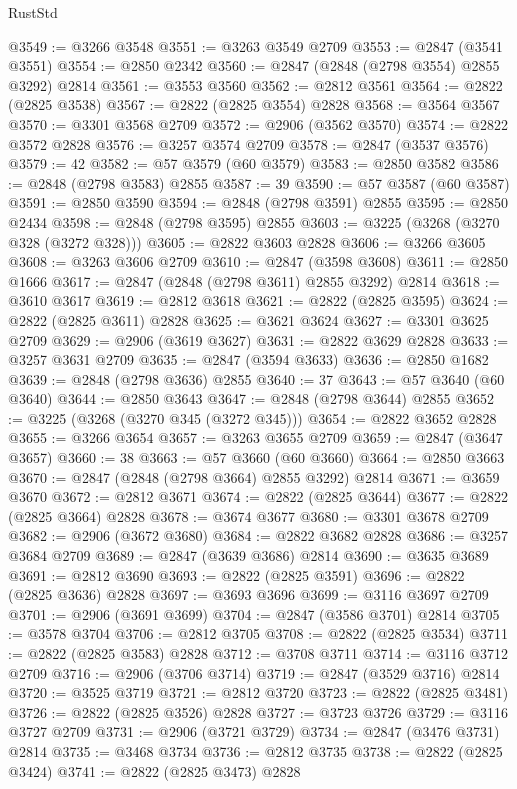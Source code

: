 \begin{lexlean}{RustStd}
\begin{coremodule}
@3549 := @3266 @3548
@3551 := @3263 @3549 @2709
@3553 := @2847 (@3541 @3551)
@3554 := @2850 @2342
@3560 := @2847 (@2848 (@2798 @3554) @2855 @3292) @2814
@3561 := @3553 @3560
@3562 := @2812 @3561
@3564 := @2822 (@2825 @3538)
@3567 := @2822 (@2825 @3554) @2828
@3568 := @3564 @3567
@3570 := @3301 @3568 @2709
@3572 := @2906 (@3562 @3570)
@3574 := @2822 @3572 @2828
@3576 := @3257 @3574 @2709
@3578 := @2847 (@3537 @3576)
@3579 := 42
@3582 := @57 @3579 (@60 @3579)
@3583 := @2850 @3582
@3586 := @2848 (@2798 @3583) @2855
@3587 := 39
@3590 := @57 @3587 (@60 @3587)
@3591 := @2850 @3590
@3594 := @2848 (@2798 @3591) @2855
@3595 := @2850 @2434
@3598 := @2848 (@2798 @3595) @2855
@3603 := @3225 (@3268 (@3270 @328 (@3272 @328)))
@3605 := @2822 @3603 @2828
@3606 := @3266 @3605
@3608 := @3263 @3606 @2709
@3610 := @2847 (@3598 @3608)
@3611 := @2850 @1666
@3617 := @2847 (@2848 (@2798 @3611) @2855 @3292) @2814
@3618 := @3610 @3617
@3619 := @2812 @3618
@3621 := @2822 (@2825 @3595)
@3624 := @2822 (@2825 @3611) @2828
@3625 := @3621 @3624
@3627 := @3301 @3625 @2709
@3629 := @2906 (@3619 @3627)
@3631 := @2822 @3629 @2828
@3633 := @3257 @3631 @2709
@3635 := @2847 (@3594 @3633)
@3636 := @2850 @1682
@3639 := @2848 (@2798 @3636) @2855
@3640 := 37
@3643 := @57 @3640 (@60 @3640)
@3644 := @2850 @3643
@3647 := @2848 (@2798 @3644) @2855
@3652 := @3225 (@3268 (@3270 @345 (@3272 @345)))
@3654 := @2822 @3652 @2828
@3655 := @3266 @3654
@3657 := @3263 @3655 @2709
@3659 := @2847 (@3647 @3657)
@3660 := 38
@3663 := @57 @3660 (@60 @3660)
@3664 := @2850 @3663
@3670 := @2847 (@2848 (@2798 @3664) @2855 @3292) @2814
@3671 := @3659 @3670
@3672 := @2812 @3671
@3674 := @2822 (@2825 @3644)
@3677 := @2822 (@2825 @3664) @2828
@3678 := @3674 @3677
@3680 := @3301 @3678 @2709
@3682 := @2906 (@3672 @3680)
@3684 := @2822 @3682 @2828
@3686 := @3257 @3684 @2709
@3689 := @2847 (@3639 @3686) @2814
@3690 := @3635 @3689
@3691 := @2812 @3690
@3693 := @2822 (@2825 @3591)
@3696 := @2822 (@2825 @3636) @2828
@3697 := @3693 @3696
@3699 := @3116 @3697 @2709
@3701 := @2906 (@3691 @3699)
@3704 := @2847 (@3586 @3701) @2814
@3705 := @3578 @3704
@3706 := @2812 @3705
@3708 := @2822 (@2825 @3534)
@3711 := @2822 (@2825 @3583) @2828
@3712 := @3708 @3711
@3714 := @3116 @3712 @2709
@3716 := @2906 (@3706 @3714)
@3719 := @2847 (@3529 @3716) @2814
@3720 := @3525 @3719
@3721 := @2812 @3720
@3723 := @2822 (@2825 @3481)
@3726 := @2822 (@2825 @3526) @2828
@3727 := @3723 @3726
@3729 := @3116 @3727 @2709
@3731 := @2906 (@3721 @3729)
@3734 := @2847 (@3476 @3731) @2814
@3735 := @3468 @3734
@3736 := @2812 @3735
@3738 := @2822 (@2825 @3424)
@3741 := @2822 (@2825 @3473) @2828

\end{coremodule}
\end{lexlean}
